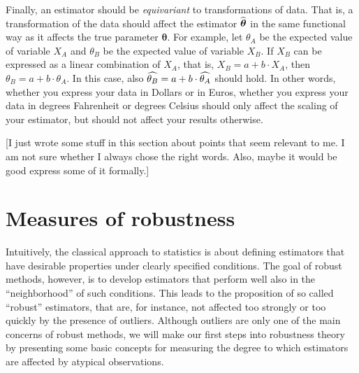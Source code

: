 Finally, an estimator should be \emph{equivariant} to transformations of data.
That is, a transformation of the data should affect the estimator
$\widehat{\boldsymbol\theta}$ in the same functional way as it affects the true
parameter $\boldsymbol\theta$. For example, let $\theta_A$ be the expected
value of variable $X_A$ and $\theta_B$ be the expected value of variable $X_B$.
If $X_B$ can be expressed as a linear combination of $X_A$, that is, $X_B = a +
b \cdot X_A$, then $\theta_B = a + b \cdot \theta_A$. In this case, also
$\widehat{\theta_B} = a + b \cdot \widehat{\theta_A}$ should hold. In other words,
whether you express your data in Dollars or in Euros, whether you express your
data in degrees Fahrenheit or degrees Celsius should only affect the scaling of
your estimator, but should not affect your results otherwise.

\alert{[I just wrote some stuff in this section about points that seem 
relevant to me. I am not sure whether I always chose the right words. Also, maybe 
it would be good express some of it formally.]}


\section{Measures of robustness}

Intuitively, the classical approach to statistics is about defining estimators
that have desirable properties under clearly specified conditions. The goal of
robust methods, however, is to develop estimators that perform well also in the
“neighborhood” of such conditions. This leads to the proposition of so called
“robust” estimators, that are, for instance, not affected too strongly or too
quickly by the presence of outliers. Although outliers are only one of
the main concerns of robust methods, we will make our first steps into
robustness theory by presenting some basic concepts for measuring the degree to
which estimators are affected by atypical observations.


